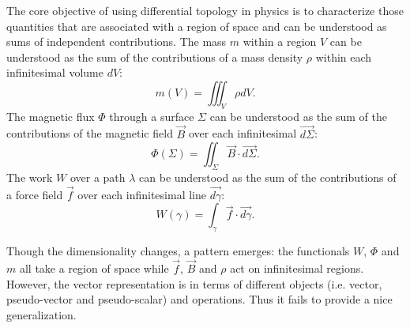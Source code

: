 \documentclass[fleqn,10pt]{wlscirep}
\begin{document}



The core objective of using differential topology in physics is to characterize those quantities that are associated with a region of space and can be understood as sums of independent contributions. The mass $m$ within a region $V$ can be understood as the sum of the contributions of a mass density $\rho$ within each infinitesimal volume $dV$:
\begin{equation*}
	m(V) = \iiint_V \rho dV.
\end{equation*}
The magnetic flux $\Phi$ through a surface $\Sigma$ can be understood as the sum of the contributions of the magnetic field $\vec{B}$ over each infinitesimal $\vec{d\Sigma}$:
\begin{equation*}
	\Phi(\Sigma) = \iint_\Sigma \vec{B} \cdot \vec{d\Sigma}.
\end{equation*}
The work $W$ over a path $\lambda$ can be understood as the sum of the contributions of a force field $\vec{f}$ over each infinitesimal line $\vec{d\gamma}$:
\begin{equation*}
	W(\gamma) = \int_\gamma \vec{f} \cdot \vec{d\gamma}.
\end{equation*}

Though the dimensionality changes, a pattern emerges: the functionals $W$, $\Phi$ and $m$ all take a region of space while $\vec{f}$, $\vec{B}$ and $\rho$ act on infinitesimal regions. However, the vector representation is in terms of different objects (i.e. vector, pseudo-vector and pseudo-scalar) and operations. Thus it fails to provide a nice generalization.
\end{document}
